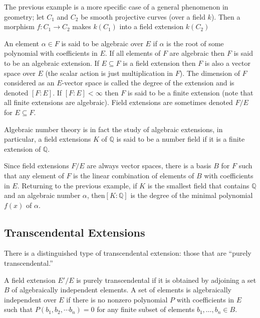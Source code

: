 \begin{example} The previous example is a more specific case of a general
phenomenon in geometry; let $C_1$ and $C_2$ be smooth projective curves (over a
field $k$). Then a morphism $f:C_1\rightarrow C_2$ makes $k(C_1)$ into a field
extension $k(C_2)$ 
\end{example}

\begin{definition}An element $\alpha\in F$ is said to be algebraic over $E$ if
$\alpha$ is the root of some polynomial with coefficients in $E$. If all
elements of $F$ are algebraic then $F$ is said to be an algebraic extension. If
$E\subseteq F$ is a field extension then $F$ is also a vector space over $E$
(the scalar action is just multiplication in $F$). The dimension of $F$
considered as an $E$-vector space is called the degree of the extension and is
denoted $[F:E]$. If $[F:E]<\infty$ then $F$ is said to be a finite extension
(note that all finite extensions are algebraic). Field extensions are sometimes
denoted $F/E$ for $E\subseteq F$.
\end{definition}

Algebraic number theory is in fact the study of algebraic extensions, in
particular, a field extensions $K$ of $\mathbb{Q}$ is said to be a number field
if it is a finite extension of $\mathbb{Q}$.

Since field extensions $F/E$ are always vector spaces, there is a basis $B$ for
$F$ such that any element of $F$ is the linear combination of elements of $B$
with coefficients in $E$. Returning to the previous example, if $K$ is the
smallest field that contains $\mathbb{Q}$ and an algebraic number $\alpha$,
then$[K:\mathbb{Q}]$ is the degree of the minimal polynomial $f(x)$ of $\alpha$.

\subsection{Transcendental Extensions}
There is a distinguished type of transcendental extension: those that are
``purely transcendental.'' 
\begin{definition} A field extension $E'/E$ is purely transcendental if it is
obtained by adjoining a set $B$ of algebraically independent elements. A set of
elements is algebraically independent over $E$  if there is no nonzero polynomial $P$
with coefficients in $E$ such
that $P(b_1,b_2,\cdots b_n)=0$ for any finite subset of elements $b_1, \dots,
b_n \in B$.
\end{definition}

